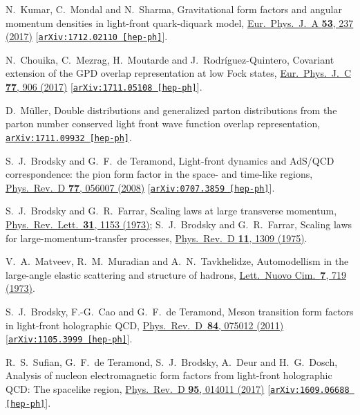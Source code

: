 \documentclass[aps,prl,reprint,groupedaddress, preprintnumbers]{revtex4-1}
\begin{document}
\begin{thebibliography}{50}
  N.~Kumar, C.~Mondal and N.~Sharma,
  Gravitational form factors and angular momentum densities in light-front quark-diquark model,
 \href{https://doi.org/10.1140/epja/i2017-12433-0}{Eur.\ Phys.\ J.\ A {\bf 53}, 237 (2017)}
  [\href{https://arxiv.org/abs/1712.02110}{\tt arXiv:1712.02110 [hep-ph]}]. 
  
  
  N.~Chouika, C.~Mezrag, H.~Moutarde and J.~Rodr\'iguez-Quintero,
  Covariant extension of the GPD overlap representation at low Fock states,
  \href{https://doi.org/10.1140/epjc/s10052-017-5465-6}{Eur.\ Phys.\ J.\ C {\bf 77},  906 (2017)}
  [\href{https://arxiv.org/abs/1711.05108}{\tt arXiv:1711.05108 [hep-ph]}]. 
  
  
  D.~M\"uller,
  Double distributions and generalized parton distributions from the parton number conserved light front wave function overlap representation,
  \href{https://arxiv.org/abs/1711.09932}{\tt arXiv:1711.09932 [hep-ph]}.
   
 
 S.~J.~Brodsky and G.~F.~de Teramond,
 Light-front dynamics and AdS/QCD correspondence: the pion form factor in the space- and time-like regions,
 \href{https://doi.org/10.1103/PhysRevD.77.056007}{ Phys.\ Rev.\  D {\bf 77}, 056007 (2008)}
 [\href{https://arXiv.org/abs/0707.3859}{\tt arXiv:0707.3859 [hep-ph]}].
 
 
  S.~J.~Brodsky and G.~R.~Farrar,
 Scaling laws at large transverse momentum,
 \href{https://doi.org/10.1103/PhysRevLett.31.1153}{ Phys.\ Rev.\ Lett.\  {\bf 31}, 1153 (1973)};
  S.~J.~Brodsky and G.~R.~Farrar,
  Scaling laws for large-momentum-transfer processes,
  \href{https://doi.org/10.1103/PhysRevD.11.1309}{Phys.\ Rev.\ D {\bf 11}, 1309 (1975)}.
   
   
  V.~A.~Matveev, R.~M.~Muradian and A.~N.~Tavkhelidze,
 Automodellism in the large-angle elastic scattering and structure of hadrons,
  \href{https://doi.org/10.1007/BF02728133}{ Lett.\ Nuovo Cim.\  {\bf 7}, 719 (1973)}.


  S.~J.~Brodsky, F.-G.~Cao and G.~F.~de Teramond,
  Meson transition form factors in light-front holographic QCD,
  \href{https://doi.org/10.1103/PhysRevD.84.075012}{Phys.\ Rev.\ D\ {\bf 84}, 075012  (2011)}
  [\href{https://arXiv.org/abs/1105.3999}{\tt arXiv:1105.3999 [hep-ph]}].


  R.~S.~Sufian, G.~F.~de Teramond, S.~J.~Brodsky, A.~Deur and H.~G.~Dosch,
  Analysis of nucleon electromagnetic form factors from light-front holographic QCD: The spacelike region,
  \href{https://doi.org/10.1103/PhysRevD.95.014011}{Phys.\ Rev.\ D {\bf 95},  014011 (2017)}
  [\href{https://arxiv.org/abs/1609.06688}{\tt arXiv:1609.06688 [hep-ph]}].
  

\end{thebibliography}
\end{document}
